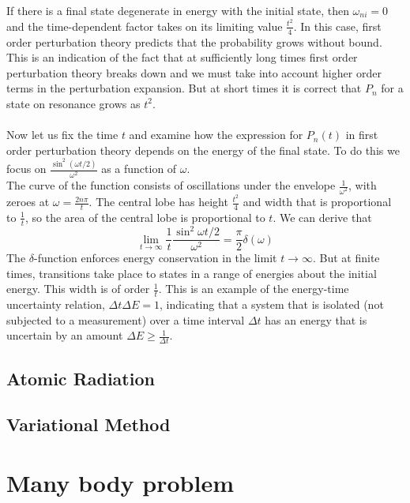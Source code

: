 If there is a final state degenerate in energy with the initial state, then $\omega_{ni}=0$ and the time-dependent factor takes on its limiting value $\frac{t^2}{4}$. In this case, first order perturbation theory predicts that the probability grows without bound. 
This is an indication of the fact that at sufficiently long times first order perturbation theory breaks down and we must take into account higher order terms in the perturbation expansion. But at short times it is correct that $P_n$ for a state on resonance grows as $t^2$.\\ \\
Now let us fix the time $t$ and examine how the expression for $P_n(t)$ in first order perturbation theory depends on the energy of the final state. To do this we focus on $\frac{\sin^2(\omega t/2)}{\omega^2}$ as a function of $\omega$.\\
The curve of the function consists of oscillations under the envelope $\frac{1}{\omega^2}$, with zeroes at $\omega = \frac{2n\pi}{t}$. The
central lobe has height $\frac{t^2}{4}$ and width that is proportional to $\frac{1}{t}$, so the area of the central lobe
is proportional to $t$. We can derive that
\[\lim_{t \to \infty} \frac{1}{t} \frac{\sin^2\omega t/2}{\omega^2} = \frac{\pi}{2}\delta(\omega)\]
The $\delta$-function enforces energy conservation in the limit $t \to \infty$. But at finite times, transitions take place to states in a range of energies about the initial energy.
This width is of order $\frac{1}{t}$. This is an example of
the energy-time uncertainty relation, $\Delta t \Delta E = 1$, indicating that a system that is isolated (not
subjected to a measurement) over a time interval $\Delta t$ has an energy that is uncertain by an amount $\Delta E \geq \frac{1}{\Delta t}$.

\section{Atomic Radiation}
\section{Variational Method}

\chapter{Many body problem}
